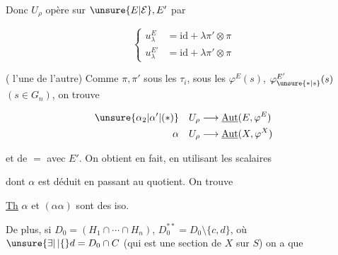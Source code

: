Donc $U_\rho$ opère  sur $\unsure{E|\mathcal E},E'$ par

\[
\left\{\begin{aligned}
u_\lambda^E &=\mathrm{id}+\lambda\pi'\otimes\pi\\
u_\lambda^{E'}&=\mathrm{id}+\lambda\pi'\otimes\pi
\end{aligned}\right.
\]

(  l'une de l'autre) Comme $\pi,\pi'$  sous les $\tau_i$,  sous les $\varphi^E(s)$, $\varphi_{\unsure{*|s}}^{E'}(s)$ $(s\in G_n)$, on trouve

\[
\begin{aligned}
\unsure{\alpha_2|\alpha'|(*)}\quad U_\rho&\longrightarrow\underline{\operatorname{Aut}}(E,\varphi^E)\\
\alpha\quad U_\rho&\longrightarrow\underline{\operatorname{Aut}}(X,\varphi^X)
\end{aligned}
\]

et de $=$ avec $E'$. On obtient en fait, en utilisant les scalaires


dont $\alpha$ est déduit en passant au quotient. On trouve

\uline{Th} $\alpha$ et $(\alpha\alpha)$ sont des iso.

De plus, si $D_0=(H_1\cap\cdots\cap H_n)$, $D_0^{**}=D_0\setminus\{c,d\}$, où $\unsure{\exists|\,|\{}d=D_0\cap C$ (qui est une section de $X$ sur $S$)  on a que
